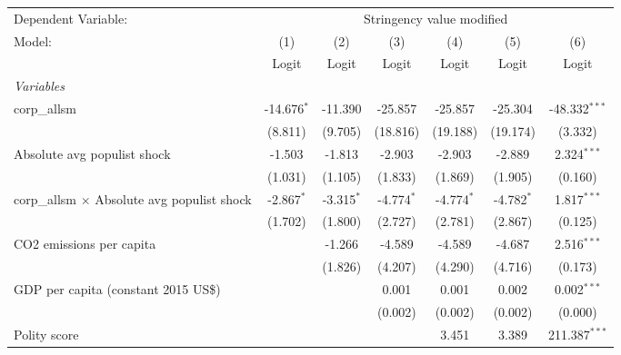 
\begingroup
\centering
\begin{tabular}{lcccccc}
   \toprule
   Dependent Variable: & \multicolumn{6}{c}{Stringency value modified}\\
   Model:                                             & (1)           & (2)          & (3)          & (4)          & (5)          & (6)\\  
                                                      &  Logit        & Logit        & Logit        & Logit        & Logit        & Logit\\  
   \midrule
   \emph{Variables}\\
   corp\_allsm                                        & -14.676$^{*}$ & -11.390      & -25.857      & -25.857      & -25.304      & -48.332$^{***}$\\   
                                                      & (8.811)       & (9.705)      & (18.816)     & (19.188)     & (19.174)     & (3.332)\\   
   Absolute avg populist shock                        & -1.503        & -1.813       & -2.903       & -2.903       & -2.889       & 2.324$^{***}$\\   
                                                      & (1.031)       & (1.105)      & (1.833)      & (1.869)      & (1.905)      & (0.160)\\   
   corp\_allsm $\times$ Absolute avg populist shock   & -2.867$^{*}$  & -3.315$^{*}$ & -4.774$^{*}$ & -4.774$^{*}$ & -4.782$^{*}$ & 1.817$^{***}$\\   
                                                      & (1.702)       & (1.800)      & (2.727)      & (2.781)      & (2.867)      & (0.125)\\   
   CO2 emissions per capita                           &               & -1.266       & -4.589       & -4.589       & -4.687       & 2.516$^{***}$\\   
                                                      &               & (1.826)      & (4.207)      & (4.290)      & (4.716)      & (0.173)\\   
   GDP per capita (constant 2015 US\$)                &               &              & 0.001        & 0.001        & 0.002        & 0.002$^{***}$\\   
                                                      &               &              & (0.002)      & (0.002)      & (0.002)      & (0.000)\\   
   Polity score                                       &               &              &              & 3.451        & 3.389        & 211.387$^{***}$\\   

\end{tabular}
